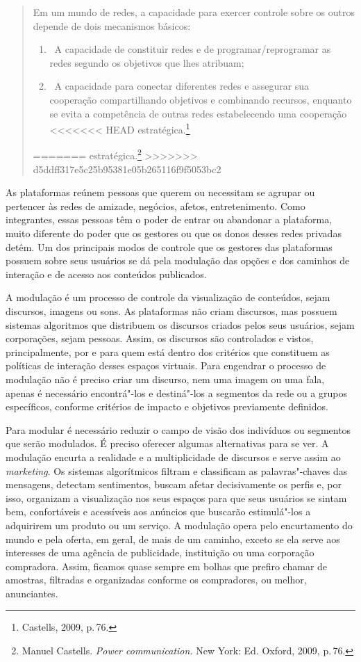 \begin{quote}
Em um mundo de redes, a capacidade para exercer controle sobre os outros
depende de dois mecanismos básicos:
\begin{enumerate}
\item\, A capacidade de constituir redes
e de programar/reprogramar as redes segundo os objetivos que lhes
atribuam;
\item\, A capacidade para conectar diferentes redes e assegurar
sua cooperação compartilhando objetivos e combinando recursos, enquanto
se evita a competência de outras redes estabelecendo uma cooperação
<<<<<<< HEAD
estratégica.\footnote{Castells, 2009, p.\,76.}
\end{enumerate}
=======
estratégica.\footnote{Manuel Castells. \emph{Power communication.} New York: Ed. Oxford,
2009, p.\,76.}
>>>>>>> d5ddff317e5c25b95381e05b265116f9f5053bc2
\end{quote}

As plataformas reúnem pessoas que querem ou necessitam se agrupar ou
pertencer às redes de amizade, negócios, afetos, entretenimento. Como
integrantes, essas pessoas têm o poder de entrar ou abandonar a
plataforma, muito diferente do poder que os gestores ou que os donos
desses redes privadas detêm. Um dos principais modos de controle que os
gestores das plataformas possuem sobre seus usuários se dá pela
modulação das opções e dos caminhos de interação e de acesso aos
conteúdos publicados.

A modulação é um processo de controle da visualização de conteúdos,
sejam discursos, imagens ou sons. As plataformas não criam discursos,
mas possuem sistemas algoritmos que distribuem os discursos criados
pelos seus usuários, sejam corporações, sejam pessoas. Assim, os
discursos são controlados e vistos, principalmente, por e para quem está
dentro dos critérios que constituem as políticas de interação desses
espaços virtuais. Para engendrar o processo de modulação não é preciso
criar um discurso, nem uma imagem ou uma fala, apenas é necessário
encontrá"-los e destiná"-los a segmentos da rede ou a grupos específicos,
conforme critérios de impacto e objetivos previamente definidos.

Para modular é necessário reduzir o campo de visão dos indivíduos ou
segmentos que serão modulados. É preciso oferecer algumas alternativas
para se ver. A modulação encurta a realidade e a multiplicidade de
discursos e serve assim ao \emph{marketing}. Os sistemas algorítmicos filtram e
classificam as palavras"-chaves das mensagens, detectam sentimentos,
buscam afetar decisivamente os perfis e, por isso, organizam a
visualização nos seus espaços para que seus usuários se sintam bem,
confortáveis e acessíveis aos anúncios que buscarão estimulá"-los a
adquirirem um produto ou um serviço. A modulação opera pelo encurtamento
do mundo e pela oferta, em geral, de mais de um caminho, exceto se ela
serve aos interesses de uma agência de publicidade, instituição ou uma
corporação compradora. Assim, ficamos quase sempre em bolhas que prefiro
chamar de amostras, filtradas e organizadas conforme os compradores, ou
melhor, anunciantes.

